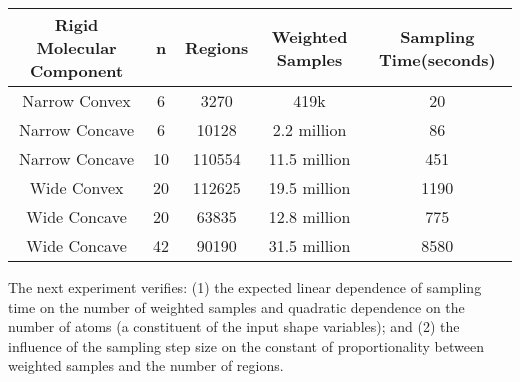 \documentclass[]{article}
\newcommand{\rmc}{rigid molecular component}
\begin{document}
\begin{table*}[htpb]
\centering
		\begin{tabular}{ccccc}
\hline
Rigid Molecular Component&n&Regions&Weighted Samples& Sampling Time(seconds)\\\hline\hline
Narrow Convex &6&3270&419k&20\\\hline
Narrow Concave &6&10128&2.2 million& 86\\\hline
Narrow Concave &10&110554&11.5 million& 451\\\hline
Wide Convex &20&112625&19.5 million&1190\\ \hline
Wide Concave &20&63835&12.8 million& 775\\ \hline
Wide Concave &42&90190&31.5 million& 8580\\ \hline
\end{tabular}
\caption{\scriptsize \textbf{Verifying the Core Algorithm's Time Complexity}:
Number of regions and sampling time for different input \rmc\ pairs. 
These are averages for sampling 10 randomly chosen initial 5D nodes
and all their descendants. In these results, the ratio of the radius to step size 
is set to 3. See Section \ref{sec:results:complexity}}
\label{tab:performance}
\end{table*}
\begin{figure*}[htpb]
\centering
{}
\caption{\scriptsize \textbf{Verifying Time Complexity}: (a) The plot of the number of atoms and the number
of samples against the sampling time. The plot also shows bivariate function fit to this
data. (b) shows slices of the bivariate function in (a) at  15, 25 and 35. These
show a linear relationship between the number of samples and the sampling time
when  is kept constant. (c) Plot of the number of weighted samples against
the number of regions for the wide concave \rmc\ system (42 Atoms). The plot shows
that the linear factor in regions vs weighted samples also depends on step
size. As the step-size increases, the slope of the line 
increases (see text in Section \ref{sec:results:complexity} for details).}
\end{figure*}

The next experiment verifies: (1) the expected linear dependence of sampling
time on the number of weighted samples and quadratic dependence on the number
of atoms (a constituent of the input shape variables); and (2) the influence of
the sampling step size on the constant of proportionality between weighted samples 
and the number of regions.
\end{document}
